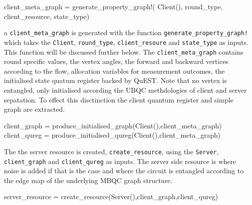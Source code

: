 \documentclass[
]{article}
\newenvironment{Shaded}{}{}
\newcommand{\FunctionTok}[1]{\textcolor[rgb]{0.02,0.16,0.49}{#1}}
\newcommand{\NormalTok}[1]{#1}
\newcommand{\OperatorTok}[1]{\textcolor[rgb]{0.40,0.40,0.40}{#1}}
\begin{document}
\begin{Shaded}
\begin{Highlighting}[]
\NormalTok{    client\_meta\_graph }\OperatorTok{=} \FunctionTok{generate\_property\_graph!}\NormalTok{(}
        \FunctionTok{Client}\NormalTok{(),}
\NormalTok{        round\_type,}
\NormalTok{        client\_resource,}
\NormalTok{        state\_type)}
\end{Highlighting}
\end{Shaded}

a \texttt{client\_meta\_graph} is generated with the function
\texttt{generate\_property\_graph!} which takes the \texttt{Client},
\texttt{round\_type}, \texttt{client\_resoure} and \texttt{state\_type}
as inputs. This function will be discussed further below. The
\texttt{client\_meta\_graph} contains round specific values, the vertex
angles, the forward and backward vertices according to the flow,
allocation variables for measurement outcomes, the initialised state
quatum register backed by QuEST. Note that no vertex is entangled, only
initialised according the UBQC methdologies of client and server
sepatation. To effect this disctinction the client quantum register and
simple graph are extracted.

\begin{Shaded}
\begin{Highlighting}[]
\NormalTok{    client\_graph }\OperatorTok{=} \FunctionTok{produce\_initialised\_graph}\NormalTok{(}\FunctionTok{Client}\NormalTok{(),client\_meta\_graph)}
\NormalTok{    client\_qureg }\OperatorTok{=} \FunctionTok{produce\_initialised\_qureg}\NormalTok{(}\FunctionTok{Client}\NormalTok{(),client\_meta\_graph)}
\end{Highlighting}
\end{Shaded}

The the server resource is created, \texttt{create\_resource}, using the
\texttt{Server}, \texttt{client\_graph} and \texttt{client\_qureg} as
inputs. The server side resource is where noise is added if that is the
case and where the circuit is entangled according to the edge map of the
underlying MBQC graph structure.

\begin{Shaded}
\begin{Highlighting}[]
\NormalTok{    server\_resource }\OperatorTok{=} \FunctionTok{create\_resource}\NormalTok{(}\FunctionTok{Server}\NormalTok{(),client\_graph,client\_qureg)}
\end{Highlighting}
\end{Shaded}
\end{document}
